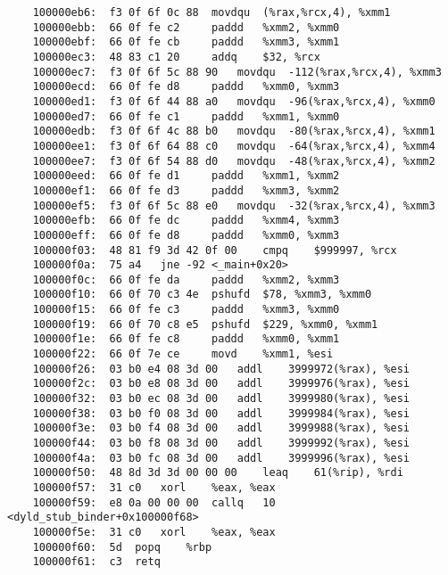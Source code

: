 \documentclass[a4paper]{article}
\begin{document}
\begin{lstlisting}
    100000eb6:	f3 0f 6f 0c 88 	movdqu	(%rax,%rcx,4), %xmm1
    100000ebb:	66 0f fe c2 	paddd	%xmm2, %xmm0
    100000ebf:	66 0f fe cb 	paddd	%xmm3, %xmm1
    100000ec3:	48 83 c1 20 	addq	$32, %rcx
    100000ec7:	f3 0f 6f 5c 88 90 	movdqu	-112(%rax,%rcx,4), %xmm3
    100000ecd:	66 0f fe d8 	paddd	%xmm0, %xmm3
    100000ed1:	f3 0f 6f 44 88 a0 	movdqu	-96(%rax,%rcx,4), %xmm0
    100000ed7:	66 0f fe c1 	paddd	%xmm1, %xmm0
    100000edb:	f3 0f 6f 4c 88 b0 	movdqu	-80(%rax,%rcx,4), %xmm1
    100000ee1:	f3 0f 6f 64 88 c0 	movdqu	-64(%rax,%rcx,4), %xmm4
    100000ee7:	f3 0f 6f 54 88 d0 	movdqu	-48(%rax,%rcx,4), %xmm2
    100000eed:	66 0f fe d1 	paddd	%xmm1, %xmm2
    100000ef1:	66 0f fe d3 	paddd	%xmm3, %xmm2
    100000ef5:	f3 0f 6f 5c 88 e0 	movdqu	-32(%rax,%rcx,4), %xmm3
    100000efb:	66 0f fe dc 	paddd	%xmm4, %xmm3
    100000eff:	66 0f fe d8 	paddd	%xmm0, %xmm3
    100000f03:	48 81 f9 3d 42 0f 00 	cmpq	$999997, %rcx
    100000f0a:	75 a4 	jne	-92 <_main+0x20>
    100000f0c:	66 0f fe da 	paddd	%xmm2, %xmm3
    100000f10:	66 0f 70 c3 4e 	pshufd	$78, %xmm3, %xmm0
    100000f15:	66 0f fe c3 	paddd	%xmm3, %xmm0
    100000f19:	66 0f 70 c8 e5 	pshufd	$229, %xmm0, %xmm1
    100000f1e:	66 0f fe c8 	paddd	%xmm0, %xmm1
    100000f22:	66 0f 7e ce 	movd	%xmm1, %esi
    100000f26:	03 b0 e4 08 3d 00 	addl	3999972(%rax), %esi
    100000f2c:	03 b0 e8 08 3d 00 	addl	3999976(%rax), %esi
    100000f32:	03 b0 ec 08 3d 00 	addl	3999980(%rax), %esi
    100000f38:	03 b0 f0 08 3d 00 	addl	3999984(%rax), %esi
    100000f3e:	03 b0 f4 08 3d 00 	addl	3999988(%rax), %esi
    100000f44:	03 b0 f8 08 3d 00 	addl	3999992(%rax), %esi
    100000f4a:	03 b0 fc 08 3d 00 	addl	3999996(%rax), %esi
    100000f50:	48 8d 3d 3d 00 00 00 	leaq	61(%rip), %rdi
    100000f57:	31 c0 	xorl	%eax, %eax
    100000f59:	e8 0a 00 00 00 	callq	10 <dyld_stub_binder+0x100000f68>
    100000f5e:	31 c0 	xorl	%eax, %eax
    100000f60:	5d 	popq	%rbp
    100000f61:	c3 	retq


\end{lstlisting}
\end{document}
